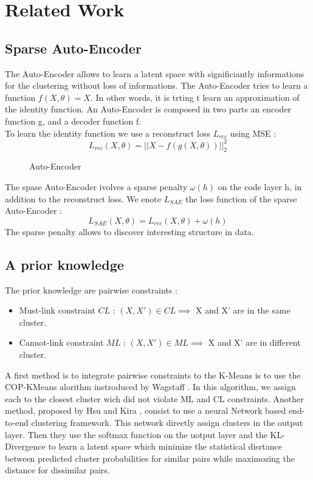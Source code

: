 \section{Related Work}\label{sec:related}

\subsection{Sparse Auto-Encoder}

The Auto-Encoder allows to learn a latent space with significiantly informations
for the clustering without loss of informations. The Auto-Encoder tries to learn
a function $f(X, \theta) = X$. In other words, it is trting t learn an
approximation of the identity function. An Auto-Encoder is composed in two
parts an encoder function g, and a decoder function f.\\
To learn the identity function we use a reconstruct loss $L_{rec}$ using MSE :
\begin{equation}
  L_{rec}(X, \theta) = || X - f(g(X, \theta)) ||_2^2 
\end{equation}

\begin{figure}[!b]
  \centering
  
  \caption{Auto-Encoder}
  \label{fig:AE}
\end{figure}
The spase Auto-Encoder ivolves a sparse penalty $\omega(h)$ on the code layer h,
in addition to the reconstruct loss. We  enote $L_{SAE}$ the loss function of
the sparse Auto-Encoder :
\begin{equation}
  L_{SAE}(X, \theta) = L_{rec}(X, \theta) + \omega(h)
\end{equation}
The sparse penalty allows to discover interesting structure in data.

\subsection{A prior knowledge}

The prior knowledge are pairwise constraints :
\begin{itemize}
\item Must-link constraint $CL$ : $(X, X') \in CL \implies $ X and X' are in the
  same cluster.
\item Cannot-link constraint $ML$ : $(X, X') \in ML \implies $ X and X' are in
  different cluster.
\end{itemize}
A first method is to integrate pairwise constraints to the K-Means is to use the
COP-KMeans alorithm instroduced by Wagstaff
\cite{Wagstaff:2001:CKC:645530.655669}. In this algorithm, we assign each to the
closest cluster wich did not violate ML and CL constraints.
Another method, proposed by Hsu and Kira \cite{2015arXiv151106321H}, consist to
use a neural Network based end-to-end clustering framework. This network
directly assign clusters in the output layer. Then they use the softmax function
on the uotput layer and the KL-Divergence to learn a latent space which minimize
the statistical disrtance between predicted cluster probabilities for similar
pairs while maximozing the distance for dissimilar pairs.
